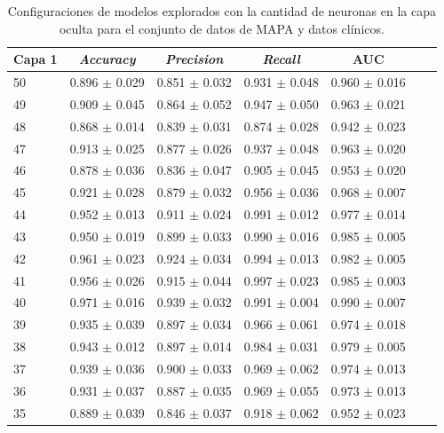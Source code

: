 \begin{table}[H]
	\centering
	\caption[Configuraciones de modelos explorados para el conjunto de datos de MAPA y datos clínicos.]{Configuraciones de modelos explorados con la cantidad de neuronas en la capa oculta para el conjunto de datos de MAPA y datos clínicos.}
	\begin{tabular}{l c c c c c c}    
		\toprule
		\textbf{Capa 1} & \textbf{\emph{Accuracy}} & \textbf{\emph{Precision}} & \textbf{\emph{Recall}}  & \textbf{AUC}\\
		\midrule
    
      50 & 0.896 $\pm$ 0.029 & 0.851 $\pm$ 0.032	& 0.931 $\pm$ 0.048 & 0.960  $\pm$ 0.016\\
      49 & 0.909 $\pm$ 0.045 & 0.864 $\pm$ 0.052	& 0.947 $\pm$ 0.050 & 0.963  $\pm$ 0.021\\
      48 & 0.868 $\pm$ 0.014 & 0.839 $\pm$ 0.031	& 0.874 $\pm$ 0.028 & 0.942  $\pm$ 0.023\\
      47 & 0.913 $\pm$ 0.025 & 0.877 $\pm$ 0.026	& 0.937 $\pm$ 0.048 & 0.963  $\pm$ 0.020\\
      46 & 0.878 $\pm$ 0.036 & 0.836 $\pm$ 0.047	& 0.905 $\pm$ 0.045 & 0.953  $\pm$ 0.020\\
      45 & 0.921 $\pm$ 0.028 & 0.879 $\pm$ 0.032	& 0.956 $\pm$ 0.036 & 0.968  $\pm$ 0.007\\
      44 & 0.952 $\pm$ 0.013 & 0.911 $\pm$ 0.024	& 0.991 $\pm$ 0.012 & 0.977  $\pm$ 0.014\\      
      43 & 0.950 $\pm$ 0.019 & 0.899 $\pm$ 0.033	& 0.990 $\pm$ 0.016 & 0.985  $\pm$ 0.005\\
      42 & 0.961 $\pm$ 0.023 & 0.924 $\pm$ 0.034	& 0.994 $\pm$ 0.013 & 0.982  $\pm$ 0.005\\
      41 & 0.956 $\pm$ 0.026 & 0.915 $\pm$ 0.044	& 0.997 $\pm$ 0.023 & 0.985  $\pm$ 0.003\\
      40 & 0.971 $\pm$ 0.016 & 0.939 $\pm$ 0.032	& 0.991 $\pm$ 0.004 & 0.990  $\pm$ 0.007\\
      39 & 0.935 $\pm$ 0.039 & 0.897 $\pm$ 0.034	& 0.966 $\pm$ 0.061 & 0.974  $\pm$ 0.018\\
      38 & 0.943 $\pm$ 0.012 & 0.897 $\pm$ 0.014	& 0.984 $\pm$ 0.031 & 0.979  $\pm$ 0.005\\
      37 & 0.939 $\pm$ 0.036 & 0.900 $\pm$ 0.033	& 0.969 $\pm$ 0.062 & 0.974  $\pm$ 0.013\\
      36 & 0.931 $\pm$ 0.037 & 0.887 $\pm$ 0.035	& 0.969 $\pm$ 0.055 & 0.973  $\pm$ 0.013\\
      35 & 0.889 $\pm$ 0.039 & 0.846 $\pm$ 0.037	& 0.918 $\pm$ 0.062 & 0.952  $\pm$ 0.023\\

\end{tabular}
\end{table}
